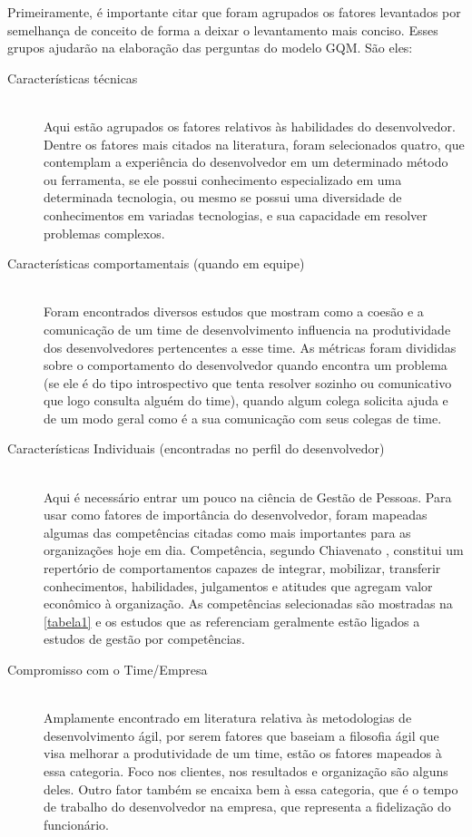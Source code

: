 Primeiramente, é importante citar que foram agrupados os fatores levantados por semelhança de conceito de forma a deixar o levantamento mais conciso. Esses grupos ajudarão na elaboração das perguntas do modelo GQM. São eles:


\begin{description}
	\item[Características técnicas] \hfill \\
	Aqui estão agrupados os fatores relativos às habilidades do desenvolvedor. Dentre os fatores mais citados na literatura, foram selecionados quatro, que contemplam a experiência do desenvolvedor em um determinado método ou ferramenta, se ele possui conhecimento especializado em uma determinada tecnologia, ou mesmo se possui uma diversidade de conhecimentos em variadas tecnologias, e sua capacidade em resolver problemas complexos.
	
	\item[Características comportamentais (quando em equipe)] \hfill \\
	Foram encontrados diversos estudos que mostram como a coesão e a comunicação de um time de desenvolvimento influencia na produtividade dos desenvolvedores pertencentes a esse time. As métricas foram divididas sobre o comportamento do desenvolvedor quando encontra um problema (se ele é do tipo introspectivo que tenta resolver sozinho ou comunicativo que logo consulta alguém do time), quando algum colega solicita ajuda e de um modo geral como é a sua comunicação com seus colegas de time.
	
	\item[Características Individuais (encontradas no perfil do desenvolvedor)] \hfill \\
	Aqui é necessário entrar um pouco na ciência de Gestão de Pessoas. Para usar como fatores de importância do desenvolvedor, foram mapeadas algumas das competências citadas como mais importantes para as organizações hoje em dia. Competência, segundo Chiavenato \cite{Chiavenato2008}, constitui um repertório de comportamentos capazes de integrar, mobilizar, transferir conhecimentos, habilidades, julgamentos e atitudes que agregam valor econômico à organização. As competências selecionadas são mostradas na \autoref{tabela1} e os estudos que as referenciam geralmente estão ligados a estudos de gestão por competências.
	
	\item[Compromisso com o Time/Empresa] \hfill \\
	Amplamente encontrado em literatura relativa às metodologias de desenvolvimento ágil, por serem fatores que baseiam a filosofia ágil que visa melhorar a produtividade de um time, estão os fatores mapeados à essa categoria. Foco nos clientes, nos resultados e organização são alguns deles. Outro fator também se encaixa bem à essa categoria, que é o tempo de trabalho do desenvolvedor na empresa, que representa a fidelização do funcionário.
	
\end{description}

